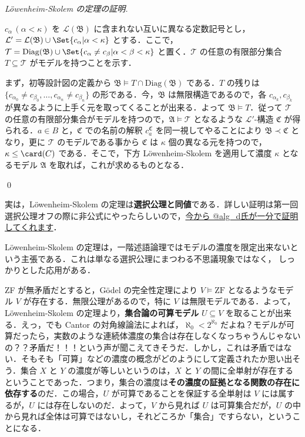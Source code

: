 \documentclass[a4j,xelatex,ja=standard]{ltjsarticle}
\newcommand{\Diag}{\mathrm{Diag}}
\begin{document}
\begin{proof}[L\"{o}wenheim-Skolem の定理の証明]
\begin{enumerate}[label=(\alph{*})]
	$c_\alpha \, (\alpha < \kappa)$ を $\mathcal{L}(\mathfrak{B})$ に含まれない互いに異なる定数記号とし，$\mathcal{L}' = \mathcal{L}(\mathfrak{B}) \cup \Set{ c_\alpha | \alpha < \kappa }$ とする．ここで，$\mathcal{T} = \Diag(\mathfrak{B}) \cup \Set{ c_\alpha \neq c_\beta | \alpha < \beta < \kappa}$ と置く．$\mathcal{T}$ の任意の有限部分集合 $T \subseteq \mathcal{T}$ がモデルを持つことを示す．

	まず，初等設計図の定義から $\mathfrak{B} \models T \cap \Diag(\mathfrak{B})$ である．$T$ の残りは $\{c_{\alpha_0} \neq c_{\beta_0}, \dots, c_{\alpha_n} \neq c_{\beta_n}\}$ の形である．今，$\mathfrak{B}$ は無限構造であるので，各 $c_{\alpha_k}, c_{\beta_k}$ が異なるように上手く元を取ってくることが出来る．よって $\mathfrak{B} \models T$．従って $\mathcal{T}$ の任意の有限部分集合がモデルを持つので，$\mathfrak{A} \models \mathcal{T}$ となるような $\mathcal{L}'$-構造 $\mathfrak{C}$ が得られる．$a \in B$ と，$\mathfrak{C}$ での名前の解釈 $c_a^\mathfrak{C}$ を同一視してやることにより $\mathfrak{B} \prec \mathfrak{C}$ となり，更に $\mathcal{T}$ のモデルである事から $\mathfrak{C}$ は $\kappa$ 個の異なる元を持つので，$\kappa \leq\card(C)$ である．そこで，下方 L\"{o}wenheim-Skolem を適用して濃度 $\kappa$ となるモデル $\mathfrak{A}$ を取れば，これが求めるものとなる． 
 \end{enumerate}\qed
\end{proof}

実は，L\"{o}wenheim-Skolem の定理は{\bfseries 選択公理と同値}である．詳しい証明は第一回選択公理オフの際に非公式にやったらしいので，\href{http://alg-d.com/math/ac/loewenheim_skolem.html}{今から @alg\_d氏が一分で証明してくれます}．

L\"{o}wenheim-Skolem の定理は，一階述語論理ではモデルの濃度を限定出来ないという主張である．これは単なる選択公理にまつわる不思議現象ではなく，
しっかりとした応用がある．

ZF が無矛盾だとすると，G\"{o}del の完全性定理により $V \models \mathrm{ZF}$ となるようなモデル $V$ が存在する．無限公理があるので，特に $V$ は無限モデルである．よって，L\"{o}wenheim-Skolem の定理より，{\bfseries 集合論の可算モデル} $U \subseteq V$ を取ることが出来る．えっ，でも Cantor の対角線論法によれば，$\aleph_0 < 2^{\aleph_0}$ だよね？モデルが可算だったら，実数のような連続体濃度の集合は存在しなくなっちゃうんじゃないの？？矛盾だ！！！という声が聞こえてきそうだ．しかし，これは矛盾ではない．そもそも「可算」などの濃度の概念がどのようにして定義されたか思い出そう．集合 $X$ と $Y$ の濃度が等しいというのは，$X$ と $Y$ の間に全単射が存在するということであった．つまり，集合の濃度は{\bfseries その濃度の証拠となる関数の存在に依存する}のだ．この場合，$U$ が可算であることを保証する全単射は $V$ には属するが，$U$ には存在しないのだ．よって，$V$ から見れば $U$ は可算集合だが，$U$ の中から見れば全体は可算ではないし，それどころか「集合」ですらない，ということになる．
\end{document}

